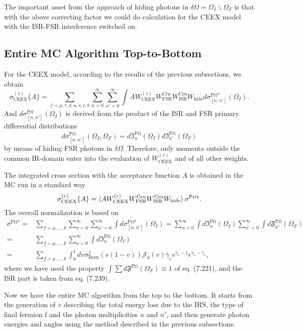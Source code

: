 The important asset from the approach of hiding photons in $\delta\Omega=\Omega_I\backslash\Omega_F$ is that with the above correcting factor we could do calculation for the CEEX model with the ISR-FSR interference switched on.

\subsection{Entire MC Algorithm Top-to-Bottom}
For the CEEX model, according to the results of the previous subsections, we obtain
\begin{equation}
\sigma^{(r)}_\text{CEEX}\{A\}=\sum_{f=\mu,\tau,d,u,s,c,b}\sum_{n=0}^{\infty}\sum_{n'=0}^{\infty}\int AW^{(r)}_\text{CEEX}W^\text{Cru}_\text{FSR}W^\text{Cru}_\text{ISR}W_\text{hide}d\sigma^{\text{Pri}\ast}_{[n,n']}(\Omega_I).
\end{equation}
And $d\sigma^{\text{Pri}}_{[n,n']}(\Omega_I)$ is derived from the product of the ISR and FSR primary differential distributions
\begin{equation}
d\sigma^{\text{Pri}}_{[n,n']}(\Omega_I,\Omega_F)=d\mathfrak{I}^\text{Pri}_n(\Omega_I)d\mathfrak{I}^\text{Pri}_{n'}(\Omega_F)
\end{equation}
by means of hiding FSR photons in $\delta\Omega$. Therefore, only momenta outside the common IR-domain enter into the evaluation of $W^{(r)}_\text{CEEX}$ and of all other weights.

The integrated cross section with the acceptance function $A$ is obtained in the MC run in a standard way
\begin{equation}
\sigma^{(r)}_\text{CEEX}\{A\}=\braket{AW^{(r)}_\text{CEEX}W^\text{Cru}_\text{FSR}W^\text{Cru}_\text{ISR}W_\text{hide}}\sigma^{\text{Pri}\ast}.
\end{equation}
The overall normalization is based on 
\begin{align}
\sigma^{\text{Pri}\ast}=&\sum_{f=\mu,\ldots,b}\sum_{n=0}^{\infty}\sum_{n'=0}^{\infty}\int d\sigma^{\text{Pri}\ast}_{[n,n']}(\Omega_I)=\sum_{n=0}^{\infty}\int d\mathfrak{I}^\text{Pri}_n(\Omega_I)\sum_{n'=0}^{\infty}\int d\mathfrak{F}^\text{Pri}_{n'}(\Omega_F)\nonumber\\
=&\sum_{f=\mu,\ldots,b}\sum_{n=0}^{\infty}\int d\mathfrak{I}^\text{Pri}_n(\Omega_I)\nonumber\\
=&\sum_{f=\mu,\ldots,b}\int_{0}^{1}dv\sigma^f_\text{Born}(s(1-v))\mathcal{J}_0(v)\bar{\gamma}_ev^{\bar{\gamma}_e-1}\epsilon^{\gamma_e-\bar{\gamma}_e},
\end{align}
where we have used the property $\int\sum d\mathfrak{F}^\text{Pri}(\Omega_F)\equiv 1$ of eq. (7.221), and the ISR part is taken from eq. (7.239). 

Now we have the entire MC algorithm from the top to the bottom. It starts from the generation of $v$ describing the total energy loss due to the IRS, the type of final fermion f and the photon multiplicities $n$ and $n'$, and then generate photon energies and angles using the method described in the previous subsections.